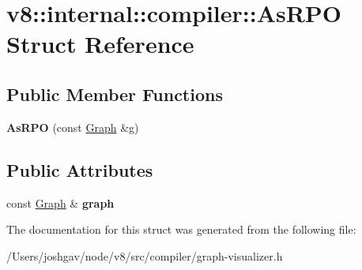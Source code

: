 \hypertarget{structv8_1_1internal_1_1compiler_1_1_as_r_p_o}{}\section{v8\+:\+:internal\+:\+:compiler\+:\+:As\+R\+PO Struct Reference}
\label{structv8_1_1internal_1_1compiler_1_1_as_r_p_o}
\subsection*{Public Member Functions}
\begin{DoxyCompactItemize}
\item 
{\bfseries As\+R\+PO} (const \hyperlink{classv8_1_1internal_1_1compiler_1_1_graph}{Graph} \&g)\hypertarget{structv8_1_1internal_1_1compiler_1_1_as_r_p_o_a9211ea2f00b34d3ea8ca614de4963716}{}\label{structv8_1_1internal_1_1compiler_1_1_as_r_p_o_a9211ea2f00b34d3ea8ca614de4963716}

\end{DoxyCompactItemize}
\subsection*{Public Attributes}
\begin{DoxyCompactItemize}
\item 
const \hyperlink{classv8_1_1internal_1_1compiler_1_1_graph}{Graph} \& {\bfseries graph}\hypertarget{structv8_1_1internal_1_1compiler_1_1_as_r_p_o_a3c00c6d27814245ad8fa87c0a7309cd4}{}\label{structv8_1_1internal_1_1compiler_1_1_as_r_p_o_a3c00c6d27814245ad8fa87c0a7309cd4}

\end{DoxyCompactItemize}


The documentation for this struct was generated from the following file\+:\begin{DoxyCompactItemize}
\item 
/\+Users/joshgav/node/v8/src/compiler/graph-\/visualizer.\+h\end{DoxyCompactItemize}
